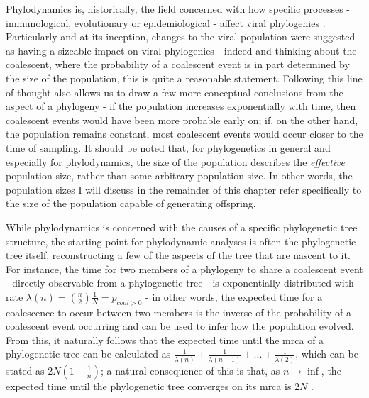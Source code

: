 Phylodynamics is, historically, the field concerned with how specific processes - immunological, evolutionary or epidemiological - affect viral phylogenies \cite{Volz2013-ey}. Particularly and at its inception, changes to the viral population were suggested as having a sizeable impact on viral phylogenies \cite{Grenfell2004-ip} - indeed and thinking about the coalescent, where the probability of a coalescent event is in part determined by the size of the population, this is quite a reasonable statement. Following this line of thought also allows us to draw a few more conceptual conclusions from the aspect of a phylogeny - if the population increases exponentially with time, then coalescent events would have been more probable early on; if, on the other hand, the population remains constant, most coalescent events would occur closer to the time of sampling. It should be noted that, for phylogenetics in general and especially for phylodynamics, the size of the population describes the \textit{effective} population size, rather than some arbitrary population size. In other words, the population sizes I will discuss in the remainder of this chapter refer specifically to the size of the population capable of generating offspring.

While phylodynamics is concerned with the causes of a specific phylogenetic tree structure, the starting point for phylodynamic analyses is often the phylogenetic tree itself, reconstructing a few of the aspects of the tree that are nascent to it. For instance, the time for two members of a phylogeny to share a coalescent event - directly observable from a phylogenetic tree - is exponentially distributed with rate $\lambda(n) = \binom{n}{2}\frac{1}{N} = p_{coal>0}$ - in other words, the expected time for a coalescence to occur between two members is the inverse of the probability of a coalescent event occurring and can be used to infer how the population evolved. From this, it naturally follows that the expected time until the \ac{mrca} of a phylogenetic tree can be calculated as $\frac{1}{\lambda(n)} + \frac{1}{\lambda(n-1)} + ... + \frac{1}{\lambda(2)}$, which can be stated as $2N(1-\frac{1}{n})$; a natural consequence of this is that, as $n \rightarrow \inf$, the expected time until the phylogenetic tree converges on its \ac{mrca} is $2N$ \cite{Volz2013-ey}. 

